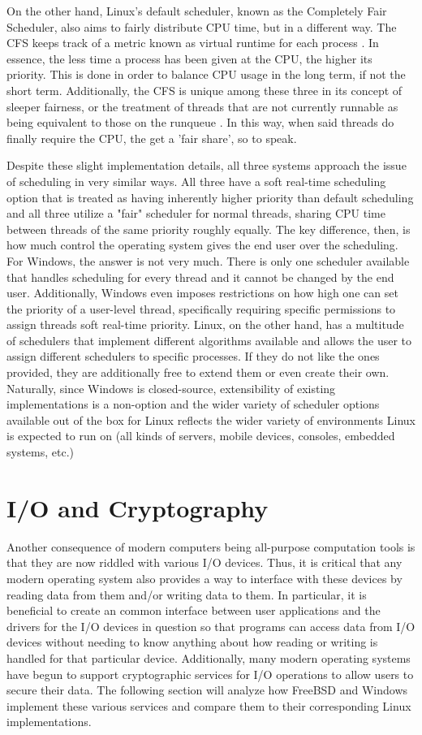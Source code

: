 \documentclass[onecolumn, draftclsnofoot,10pt, compsoc]{IEEEtran}
\begin{document}
On the other hand, Linux's default scheduler, known as the Completely Fair Scheduler, also aims to fairly distribute CPU time, but in a different way. The CFS keeps track of a metric known as virtual runtime for each process \cite{CFS}. In essence, the less time a process has been given at the CPU, the higher its priority. This is done in order to balance CPU usage in the long term, if not the short term. Additionally, the CFS is unique among these three in its concept of sleeper fairness, or the treatment of threads that are not currently runnable as being equivalent to those on the runqueue \cite{CFS}. In this way, when said threads do finally require the CPU, the get a 'fair share', so to speak. 

Despite these slight implementation details, all three systems approach the issue of scheduling in very similar ways. All three have a soft real-time scheduling option that is treated as having inherently higher priority than default scheduling and all three utilize a "fair" scheduler for normal threads, sharing CPU time between threads of the same priority roughly equally. The key difference, then, is how much control the operating system gives the end user over the scheduling. For Windows, the answer is not very much. There is only one scheduler available that handles scheduling for every thread and it cannot be changed by the end user. Additionally, Windows even imposes restrictions on how high one can set the priority of a user-level thread, specifically requiring specific permissions to assign threads soft real-time priority. Linux, on the other hand, has a multitude of schedulers that implement different algorithms available and allows the user to assign different schedulers to specific processes. If they do not like the ones provided, they are additionally free to extend them or even create their own. Naturally, since Windows is closed-source, extensibility of existing implementations is a non-option and the wider variety of scheduler options available out of the box for Linux reflects the wider variety of environments Linux is expected to run on (all kinds of servers, mobile devices, consoles, embedded systems, etc.)
\section{I/O and Cryptography}
Another consequence of modern computers being all-purpose computation tools is that they are now riddled with various I/O devices. Thus, it is critical that any modern operating system also provides a way to interface with these devices by reading data from them and/or writing data to them. In particular, it is beneficial to create an common interface between user applications and the drivers for the I/O devices in question so that programs can access data from I/O devices without needing to know anything about how reading or writing is handled for that particular device. Additionally, many modern operating systems have begun to support cryptographic services for I/O operations to allow users to secure their data. The following section will analyze how FreeBSD and Windows implement these various services and compare them to their corresponding Linux implementations.
\end{document}
